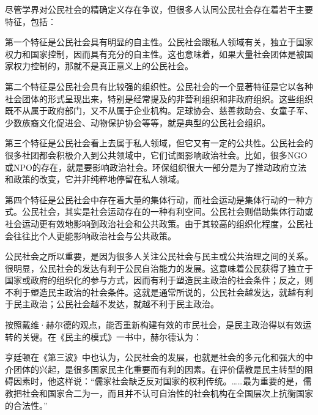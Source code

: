 尽管学界对公民社会的精确定义存在争议，但很多人认同公民社会存在着若干主要特征，包括：

第一个特征是公民社会具有明显的自主性。公民社会跟私人领域有关，独立于国家权力和国家控制，因而具有充分的自主性。这也意味着，如果大量社会团体是被国家权力控制的，那就不是真正意义上的公民社会。

第二个特征是公民社会具有比较强的组织性。公民社会的一个显著特征是它以各种社会团体的形式呈现出来，特别是经常提及的非营利组织和非政府组织。这些组织既不从属于政府部门，又不从属于企业机构。足球协会、慈善救助会、女童子军、少数族裔文化促进会、动物保护协会等等，就是典型的公民社会组织。

第三个特征是公民社会看上去属于私人领域，但它又有一定的公共性。公民社会的很多社团都会积极介入到公共领域中，它们试图影响政治社会。比如，很多NGO或NPO的存在，就是要影响政治社会。环保组织很大一部分是为了推动政府立法和政策的改变，它并非纯粹地停留在私人领域。

第四个特征是公民社会中存在着大量的集体行动，而社会运动是集体行动的一种方式。公民社会，其实是社会运动存在的一种有利空间。公民社会则借助集体行动或社会运动更有效地影响到政治社会和公共政策。由于其较高的组织化程度，公民社会往往比个人更能影响政治社会与公共政策。

公民社会之所以重要，是因为很多人关注公民社会与民主或公共治理之间的关系。很明显，公民社会的发达有利于公民自治能力的发展。这意味着公民获得了独立于国家或政府的组织化的参与方式，因而有利于塑造民主政治的社会条件；反之，则不利于塑造民主政治的社会条件。这就是通常所说的，公民社会越发达，就越有利于民主政治；公民社会越不发达，就越不利于民主政治。

按照戴维·赫尔德的观点，能否重新构建有效的市民社会，是民主政治得以有效运转的关键。在《民主的模式》一书中，赫尔德认为：


亨廷顿在《第三波》中也认为，公民社会的发展，也就是社会的多元化和强大的中介团体的兴起，是很多国家民主化重要而有利的因素。在评价儒教是民主转型的阻碍因素时，他这样说：“儒家社会缺乏反对国家的权利传统。……最为重要的是，儒教把社会和国家合二为一，而且并不认可自治性的社会机构在全国层次上抗衡国家的合法性。”

